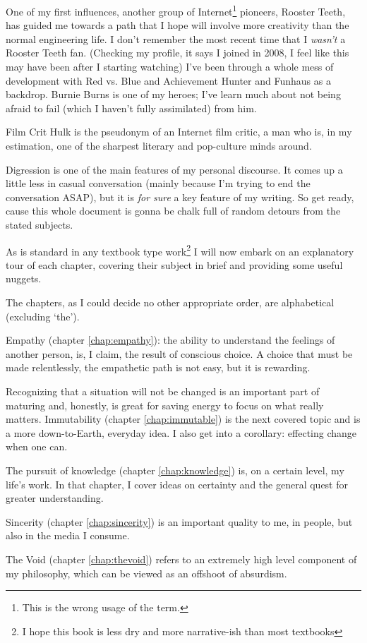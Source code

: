 \documentclass[./butidigress.tex]{subfiles}
\begin{document}
One of my first influences, another group of Internet\footnote{This is the wrong usage of the term.} pioneers, Rooster Teeth, has guided me towards a path that I hope will involve more creativity than the normal engineering life.
I don't remember the most recent time that I \emph{wasn't} a Rooster Teeth fan.
(Checking my profile, it says I joined in 2008, I feel like this may have been after I starting watching)
I've been through a whole mess of development with Red vs. Blue and Achievement Hunter and Funhaus as a backdrop.
Burnie Burns is one of my heroes; I've learn much about not being afraid to fail (which I haven't fully assimilated) from him.

Film Crit Hulk is the pseudonym of an Internet film critic, a man who is, in my estimation, one of the sharpest literary and pop-culture minds around.

\label{sec:thetitle}
Digression is one of the main features of my personal discourse.
It comes up a little less in casual conversation (mainly because I'm trying to end the conversation ASAP), but it is \emph{for sure} a key feature of my writing.
So get ready, cause this whole document is gonna be chalk full of random detours from the stated subjects.

\label{sec:chapterrundown}
As is standard in any textbook type work\footnote{I hope this book is less dry and more narrative-ish than most textbooks} I will now embark on an explanatory tour of each chapter, covering their subject in brief and providing some useful nuggets.

The chapters, as I could decide no other appropriate order, are alphabetical (excluding `the').

Empathy (chapter \ref{chap:empathy}): the ability to understand the feelings of another person, is, I claim, the result of conscious choice.
A choice that must be made relentlessly, the empathetic path is not easy, but it is rewarding.

Recognizing that a situation will not be changed is an important part of maturing and, honestly, is great for saving energy to focus on what really matters.
Immutability (chapter \ref{chap:immutable}) is the next covered topic and is a more down-to-Earth, everyday idea.
I also get into a corollary: effecting change when one can.

The pursuit of knowledge (chapter \ref{chap:knowledge}) is, on a certain level, my life's work.
In that chapter, I cover ideas on certainty and the general quest for greater understanding.

Sincerity (chapter \ref{chap:sincerity}) is an important quality to me, in people, but also in the media I consume.

The Void (chapter \ref{chap:thevoid}) refers to an extremely high level component of my philosophy, which can be viewed as an offshoot of absurdism.
\end{document}
